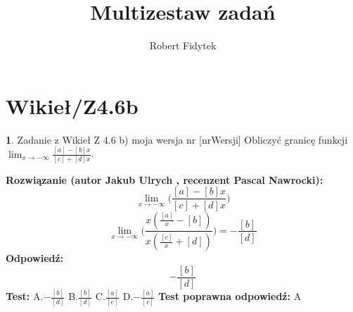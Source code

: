 \documentclass[12pt, a4paper]{article}
\title{Multizestaw zadań}
\author{Robert Fidytek}
\date{}
\theoremstyle{definition} %
\newtheorem{zad}{}
\newcommand{\kategoria}[1]{\section{#1}} %
\newcommand{\zadStart}[1]{\begin{zad}#1\newline} %
\newcommand{\zadStop}{\end{zad}}   %
\newcommand{\rozwStart}[2]{\noindent \textbf{Rozwiązanie (autor #1 , recenzent #2): }\newline} %
\newcommand{\rozwStop}{\newline}                                            %
\newcommand{\odpStart}{\noindent \textbf{Odpowiedź:}\newline}    %
\newcommand{\odpStop}{\newline}                                             %
\newcommand{\testStart}{\noindent \textbf{Test:}\newline} %
\newcommand{\testStop}{\newline} %
\newcommand{\kluczStart}{\noindent \textbf{Test poprawna odpowiedź:}\newline} %
\newcommand{\kluczStop}{\newline} %
\begin{document}
\maketitle


\kategoria{Wikieł/Z4.6b}
\zadStart{Zadanie z Wikieł Z 4.6 b) moja wersja nr [nrWersji]}
Obliczyć granicę funkcji $\lim_{x \to -\infty}\frac{[a]-[b]x}{[c]+[d]x}$.
\zadStop
\rozwStart{Jakub Ulrych}{Pascal Nawrocki}
$$\lim_{x \to -\infty}\bigg(\frac{[a]-[b]x}{[c]+[d]x}\bigg)$$
$$\lim_{x \to -\infty}\bigg(\frac{x(\frac{[a]}{x}-[b])}{x(\frac{[c]}{x}+[d])}\bigg)=-\frac{[b]}{[d]}$$
\rozwStop
\odpStart
$$-\frac{[b]}{[d]}$$
\odpStop
\testStart
A.$-\frac{[b]}{[d]}$
B.$\frac{[b]}{[d]}$
C.$\frac{[a]}{[c]}$
D.$-\frac{[a]}{[c]}$
\testStop
\kluczStart
A
\kluczStop
\end{document}
